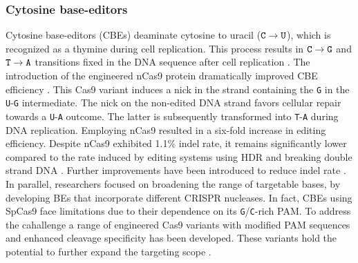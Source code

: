 \documentclass[a4paper, titlepage, openright]{book}
\begin{document}
\subsubsection{Cytosine base-editors}
Cytosine base-editors (CBEs) deaminate cytosine to uracil ($\text{\texttt{C}} \rightarrow \text{\texttt{U}}$), which is recognized as a thymine during cell replication. This process results in $\text{\texttt{C}} \rightarrow \text{\texttt{G}}$ and $\text{\texttt{T}} \rightarrow \text{\texttt{A}}$ transitions fixed in the DNA sequence after cell replication \citep{komor2016programmable,komor2017crispr}. The introduction of the engineered nCas9 protein dramatically improved CBE efficiency \citep{komor2016programmable}. This Cas9 variant induces a nick in the strand containing the \texttt{G} in the \texttt{U}-\texttt{G} intermediate. The nick on the non-edited DNA strand favors cellular repair towards a \texttt{U}-\texttt{A} outcome. The latter is subsequently transformed into \texttt{T}-\texttt{A} during DNA replication. Employing nCas9 resulted in a six-fold increase in editing efficiency. Despite nCas9 exhibited 1.1\% indel rate, it remains significantly lower compared to the rate induced by editing systems using HDR and breaking double strand DNA \citep{komor2016programmable}. Further improvements have been introduced to reduce indel rate \citep{kim2017increasing,kantor2020crispr}. In parallel, researchers focused on broadening the range of targetable bases, by developing BEs that incorporate different CRISPR nucleases. In fact, CBEs using SpCas9 face limitations due to their dependence on its \texttt{G}/\texttt{C}-rich PAM. To address the cahallenge a range of engineered Cas9 variants with modified PAM sequences and enhanced cleavage specificity has been developed. These variants hold the potential to further expand the targeting scope \citep{kim2020high,chatterjee2020engineered,miller2020continuous,zetsche2015cpf1}.

\end{document}
